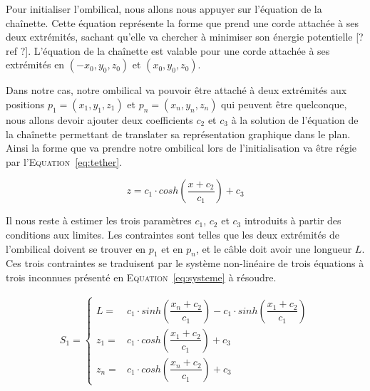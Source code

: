 				Pour initialiser l'ombilical, nous allons nous appuyer sur l'équation de la chaînette. Cette équation représente la forme que prend une corde attachée à ses deux extrémités, sachant qu'elle va chercher à minimiser son énergie potentielle [? ref ?]. L'équation de la chaînette est valable pour une corde attachée à ses extrémités en $(-x_0, y_0, z_0)$ et $(x_0, y_0, z_0)$.
				
				Dans notre cas, notre ombilical va pouvoir être attaché à deux extrémités aux positions $p_1 = (x_1, y_1, z_1)$ et $p_n = (x_n, y_n, z_n)$ qui peuvent être quelconque, nous allons devoir ajouter deux coefficients $c_2$ et $c_3$ à la solution de l'équation de la chaînette permettant de translater sa représentation graphique dans le plan. Ainsi la forme que va prendre notre ombilical lors de l'initialisation va être régie par l'\textsc{Equation}~\ref{eq:tether}.
			
				\begin{equation}
					z = c_1\cdot cosh\left(\frac{x + c_2}{c_1}\right) + c_3
					\label{eq:tether}
				\end{equation}
			
				Il nous reste à estimer les trois paramètres $c_1$, $c_2$ et $c_3$ introduits à partir des conditions aux limites. Les contraintes sont telles que les deux extrémités de l'ombilical doivent se trouver en $p_1$ et en $p_n$, et le câble doit avoir une longueur $L$. Ces trois contraintes se traduisent par le système non-linéaire de trois équations à trois inconnues présenté en \textsc{Equation}~\ref{eq:systeme} à résoudre.
				
				\begin{align}
					S_1 = 
					\begin{cases}
						L   = & c_1 \cdot sinh\left(\dfrac{x_n+c_2}{c_1}\right) - c_1 \cdot sinh\left(\dfrac{x_1+c_2}{c_1}\right) \\
						z_1 = & c_1 \cdot cosh\left(\dfrac{x_1+c_2}{c_1}\right)+c_3 \\
						z_n = & c_1 \cdot cosh\left(\dfrac{x_n+c_2}{c_1}\right)+c_3
					\end{cases}
					\label{eq:systeme}
				\end{align}
			
